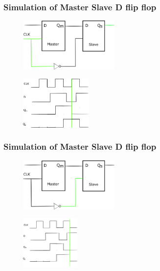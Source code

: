 \documentclass{beamer}
\begin{document}
\begin{frame}
\frametitle{Simulation of Master Slave D flip flop}
\begin{figure}[h]
    \includegraphics[width=.7\textwidth,height=100px]{name/path6.png}
\end{figure}
\begin{figure}[h]
    \includegraphics[width=.7\textwidth,height=100px]{name/clk6.png}
\end{figure}
\end{frame}

\begin{frame}
\frametitle{Simulation of Master Slave D flip flop}
\begin{figure}[h]
    \includegraphics[width=.7\textwidth,height=100px]{name/path7.png}
\end{figure}
\begin{figure}[h]
    \includegraphics[width=.7\textwidth,height=100px]{name/clk7.png}
\end{figure}
\end{frame}
\end{document}
